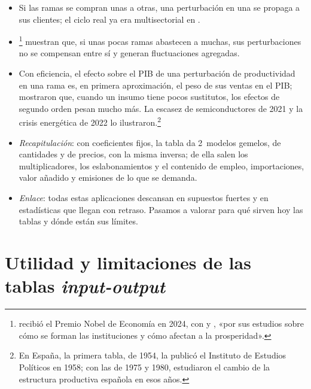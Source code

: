 \documentclass[11pt]{article}
\begin{document}
\begin{itemize}
\item Si las ramas se compran unas a otras, una perturbación en una se propaga a sus clientes; el ciclo real ya era multisectorial en \textcite{LongPlosser1983Real} .
\item \textcite{AcemogluEtAl2012Network}\footnote{ recibió el Premio Nobel de Economía en 2024, con  y , «por sus estudios sobre cómo se forman las instituciones y cómo afectan a la prosperidad»\nocite{NobelPrize2024}.} muestran que, si unas pocas ramas abastecen a muchas, sus perturbaciones no se compensan entre sí y generan fluctuaciones agregadas.
\item Con eficiencia, el efecto sobre el PIB de una perturbación de productividad en una rama es, en primera aproximación, el peso de sus ventas en el PIB\nocite{Hulten1978}; \textcite{BaqaeeFarhi2019} mostraron que, cuando un insumo tiene pocos sustitutos, los efectos de segundo orden pesan mucho más. La escasez de semiconductores de 2021 y la crisis energética de 2022 lo ilustraron.\footnote{En España, la primera tabla, de 1954, la publicó el Instituto de Estudios Políticos en 1958\nocite{AlcaideEtAl1958Estructura}; con las de 1975 y 1980, \textcite{SeguraRestoy1987} estudiaron el cambio de la estructura productiva española en esos años.}
\end{itemize}

\begin{itemize}
\item \emph{Recapitulación}: con coeficientes fijos, la tabla da 2~modelos gemelos, de cantidades y de precios, con la misma inversa; de ella salen los multiplicadores, los eslabonamientos y el contenido de empleo, importaciones, valor añadido y emisiones de lo que se demanda.
\item \emph{Enlace}: todas estas aplicaciones descansan en supuestos fuertes y en estadísticas que llegan con retraso. Pasamos a valorar para qué sirven hoy las tablas y dónde están sus límites.
\end{itemize}


\section{Utilidad y limitaciones de las tablas \emph{input-output}}\label{sec:utilidad-limitaciones}
\end{document}
